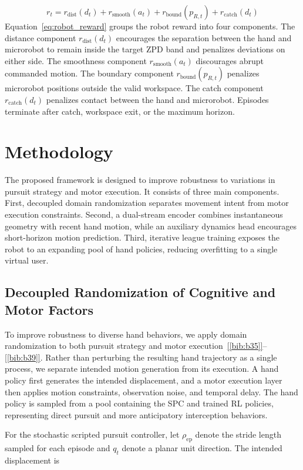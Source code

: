 \documentclass[journal,twoside,web]{ieeecolor2}
\newcommand{\citelink}[1]{\hyperref[bib:#1]{[\ref*{bib:#1}]}}
\newcommand{\citerange}[2]{\citelink{#1}--\citelink{#2}}
\begin{document}
\begin{equation}
r_t = r_{\mathrm{dist}}(d_t) + r_{\mathrm{smooth}}(a_t) + r_{\mathrm{bound}}(p_{R,t}) + r_{\mathrm{catch}}(d_t)
\label{eq:robot_reward}
\end{equation}
Equation~\eqref{eq:robot_reward} groups the robot reward into four components. The distance component $r_{\mathrm{dist}}(d_t)$ encourages the separation between the hand and microrobot to remain inside the target ZPD band and penalizes deviations on either side. The smoothness component $r_{\mathrm{smooth}}(a_t)$ discourages abrupt commanded motion. The boundary component $r_{\mathrm{bound}}(p_{R,t})$ penalizes microrobot positions outside the valid workspace. The catch component $r_{\mathrm{catch}}(d_t)$ penalizes contact between the hand and microrobot. Episodes terminate after catch, workspace exit, or the maximum horizon.

\section{Methodology}
The proposed framework is designed to improve robustness to variations in pursuit strategy and motor execution. It consists of three main components. First, decoupled domain randomization separates movement intent from motor execution constraints. Second, a dual-stream encoder combines instantaneous geometry with recent hand motion, while an auxiliary dynamics head encourages short-horizon motion prediction. Third, iterative league training exposes the robot to an expanding pool of hand policies, reducing overfitting to a single virtual user.

\subsection{Decoupled Randomization of Cognitive and Motor Factors}
To improve robustness to diverse hand behaviors, we apply domain randomization to both pursuit strategy and motor execution~\citerange{b35}{b39}. Rather than perturbing the resulting hand trajectory as a single process, we separate intended motion generation from its execution. A hand policy first generates the intended displacement, and a motor execution layer then applies motion constraints, observation noise, and temporal delay. The hand policy is sampled from a pool containing the SPC and trained RL policies, representing direct pursuit and more anticipatory interception behaviors.

For the stochastic scripted pursuit controller, let $\rho_{\mathrm{ep}}$ denote the stride length sampled for each episode and $q_t$ denote a planar unit direction. The intended displacement is
\end{document}
